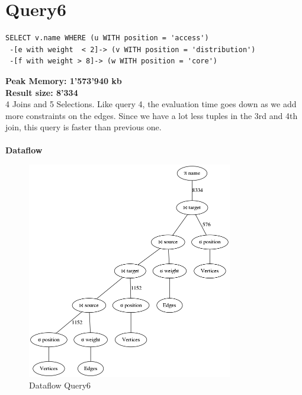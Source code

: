 \documentclass[11pt,singlecolumn]{scrartcl}
\begin{document}
\section{Query6}
\begin{verbatim}
SELECT v.name WHERE (u WITH position = 'access')
 -[e with weight  < 2]-> (v WITH position = 'distribution')
 -[f with weight > 8]-> (w WITH position = 'core')\end{verbatim}
\textbf{Peak Memory: 1'573'940 kb}\\
\textbf{Result size: 8'334}\\
4 Joins and 5 Selections. Like query 4, the evaluation time goes down as we add more constraints on the edges. Since we have a lot less tuples in the 3rd and 4th join, this query is faster than previous one.\\\\
\textbf{Dataflow}
\begin{figure}[H]
\includegraphics[width=0.8\textwidth]{graph6}
\caption{Dataflow Query6}
\end{figure}
\clearpage
\end{document}
